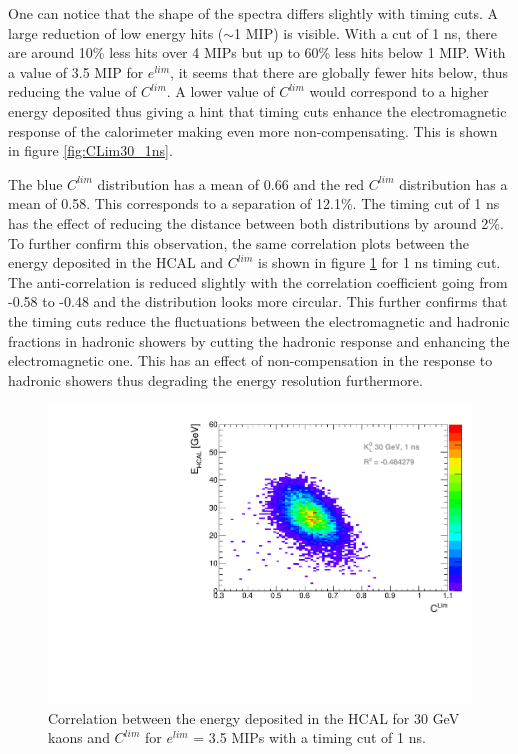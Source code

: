 One can notice that the shape of the spectra differs slightly with timing cuts. A large reduction of low energy hits ($\sim$1 MIP) is visible. With a cut of 1 ns, there are around 10\% less hits over 4 MIPs but up to 60\% less hits below 1 MIP. With a value of 3.5 MIP for $e^{lim}$, it seems that there are globally fewer hits below, thus reducing the value of $C^{lim}$. A lower value of $C^{lim}$ would correspond to a higher energy deposited thus giving a hint that timing cuts enhance the electromagnetic response of the calorimeter making even more non-compensating. This is shown in figure \ref{fig:CLim30_1ns}.


The blue $C^{lim}$ distribution has a mean of 0.66 and the red $C^{lim}$ distribution has a mean of 0.58. This corresponds to a separation of 12.1\%. The timing cut of 1 ns has the effect of reducing the distance between both distributions by around 2\%. To further confirm this observation, the same correlation plots between the energy deposited in the HCAL and $C^{lim}$ is shown in figure \ref{fig:EhcalCLim30_1ns} for 1 ns timing cut. The anti-correlation is reduced slightly with the correlation coefficient going from -0.58 to -0.48 and the distribution looks more circular. This further confirms that the timing cuts reduce the fluctuations between the electromagnetic and hadronic fractions in hadronic showers by cutting the hadronic response and enhancing the electromagnetic one. This has an effect of non-compensation in the response to hadronic showers thus degrading the energy resolution furthermore.

\begin{figure}[htbp!]
  \centering
  \includegraphics[width=0.7\linewidth]{../Thesis_Plots/ILD/AdditionalPlots/Plots/EhcalCLim_1ns_30GeV.pdf}
  \caption{Correlation between the energy deposited in the HCAL for 30 GeV kaons and $C^{lim}$ for $e^{lim}$ = 3.5 MIPs with a timing cut of 1 ns.} \label{fig:EhcalCLim30_1ns}
\end{figure}
